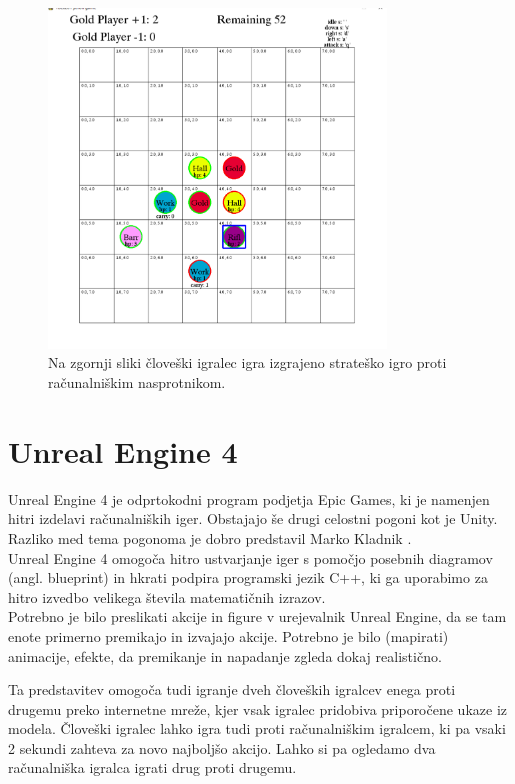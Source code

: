 \documentclass[a4paper, 12pt]{book}
\begin{document}
\begin{figure}[h]
	\begin{center}
		\includegraphics[width=0.8\textwidth]{visualization_pygame.pdf}
	\end{center}
	\caption{Na zgornji sliki človeški igralec igra izgrajeno strateško igro proti računalniškim nasprotnikom.}
	\label{visualization_pygame}
\end{figure}

\section{Unreal Engine 4}

Unreal Engine 4 je odprtokodni program podjetja Epic Games, ki je namenjen hitri izdelavi računalniških iger. Obstajajo še drugi celostni pogoni kot je Unity.\\
Razliko med tema pogonoma je dobro predstavil Marko Kladnik \cite{diploma2}.\\
Unreal Engine 4 omogoča hitro ustvarjanje iger s pomočjo posebnih diagramov (angl. blueprint) in hkrati podpira programski jezik C++, ki ga uporabimo za hitro izvedbo velikega števila matematičnih izrazov.\\

Potrebno je bilo preslikati akcije in figure v urejevalnik Unreal Engine, da se tam enote primerno premikajo in izvajajo akcije.
Potrebno je bilo (mapirati) animacije, efekte, da premikanje in napadanje zgleda dokaj realistično.

Ta predstavitev omogoča tudi igranje dveh človeških igralcev enega proti drugemu preko internetne mreže, kjer vsak igralec pridobiva priporočene ukaze iz modela.
Človeški igralec lahko igra tudi proti računalniškim igralcem, ki pa vsaki 2 sekundi zahteva za novo najboljšo akcijo.
Lahko si pa ogledamo dva računalniška igralca igrati drug proti drugemu.
\end{document}
